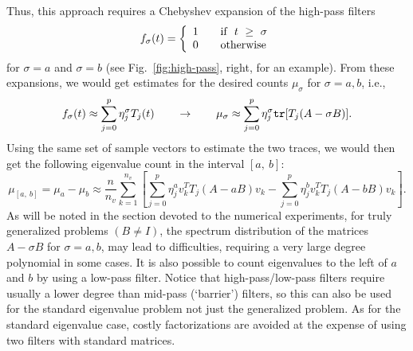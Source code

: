 \documentclass[12pt]{article}		\usepackage{tabls,multirow}
\def\trace{\mbox{\tt tr}}
\newcommand{\ab}{[a, \ b]}
\begin{document}
Thus, this approach requires a  Chebyshev expansion of the high-pass filters
\begin{eqnarray*}
f_\sigma(t) = \left\{
  \begin{array}{l l}
    1  & \quad \textrm{if}\ \ t \ \geq \ \sigma \\
    0  & \quad \textrm{otherwise}\\ 
  \end{array}
\right. 
\end{eqnarray*}
for $\sigma = a $ and $\sigma = b$ (see Fig.~\ref{fig:high-pass}, right,
 for an example). From these expansions, we would
get estimates for the desired counts $\mu_\sigma$ for $\sigma = a, b$, i.e., 
\[
f_\sigma(t)  \approx \sum_{j=0}^p 
\eta_j^{\sigma}  T_j(t) 
\qquad \rightarrow \qquad 
\mu_\sigma  \approx \sum_{j=0}^p 
\eta_j^{\sigma}  \trace [ T_j(A - \sigma B) ] .
\] 
Using the same set of sample vectors to estimate the two traces, we would then
get the following  eigenvalue count in the interval $\ab$:
\[
\mu_{\ab} = \mu_a - \mu_b 
 \approx \frac{n}{n_v} \sum_{k=1}^{n_v} 
\left[ \sum_{j=0}^p \eta_j^{a}  v_k^T T_j(A - a B) v_k  -
\sum_{j=0}^p \eta_j^{b} v_k^T T_j(A - b B) v_k \right]  . 
\]
As will be noted in the section devoted to the numerical experiments,
for truly generalized problems $(B \ne I)$, the spectrum 
distribution of the matrices $A-\sigma B$ for $\sigma = a, b$, may
lead to difficulties, requiring a very large degree polynomial in some
cases. It is also possible to count eigenvalues to the left of $a$ and
$b$ by using a low-pass filter. Notice that high-pass/low-pass filters
require usually a lower degree than mid-pass (`barrier') filters,  so
this can also be used for the standard eigenvalue problem not just the
generalized problem. As for the standard eigenvalue case, costly
factorizations are avoided at the expense of using two filters with
standard matrices.
\end{document}
